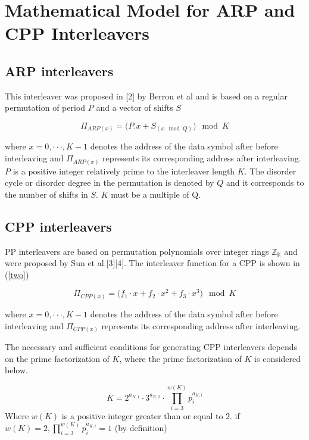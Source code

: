 \documentclass[fontsize=12pt]{article}
\begin{document}
 
 \section{Mathematical Model for ARP and CPP Interleavers}
 \subsection{ARP interleavers}
 This interleaver was proposed in [2] by Berrou et al and is based on a regular permutation of period $P$ and a vector of shifts $S$
 
 \begin{equation}
 \Pi_{ARP(x)} =\Big(P.x + S_{(x \mod Q)}\Big)\mod K
 \end{equation}
 
 where $x = 0, \cdot\cdot\cdot , K - 1$ denotes the address of the data
symbol after before interleaving and $ \Pi_{ARP(x)}$ represents its corresponding
address after interleaving. $P$ is a positive integer
relatively prime to the interleaver length $K$. The disorder cycle
or disorder degree in the permutation is denoted by $Q$ and it
corresponds to the number of shifts in $S$. $K$ must be a multiple
of Q.

 \subsection{CPP interleavers}
 PP interleavers are based on permutation polynomials over integer rings $\mathbb{Z_K}$ and were proposed by Sun et al.[3][4]. The interleaver function for a CPP is shown in (\ref{two})
 
  \begin{equation}
 \Pi_{CPP(x)} =\Big(f_1\cdot x + f_2\cdot x^2 +f_3 \cdot x^3\Big) \mod K
 \label{two}
 \end{equation}
 
 where $x = 0, \cdot\cdot\cdot , K - 1$ denotes the address of the data
symbol after before interleaving and $ \Pi_{CPP(x)}$ represents its corresponding
address after interleaving. 

The necessary and sufficient conditions for generating CPP interleavers depends on the prime factorization of $K$, where the prime factorization of $K$ is considered below.

\begin{equation}
 K =2^{a_{K,1}}\cdot 3^{a_{K,2}}\cdot \prod^{w(K)}_{i=3}p_i^{a_{K,i}}
 \label{three}
 \end{equation}
 Where $w(K)$ is a positive integer greater than or equal to $2$. if $w(K)=2,\prod^{w(K)}_{i=3}p_i^{a_{K,i}}=1 $ (by definition)
\end{document}
